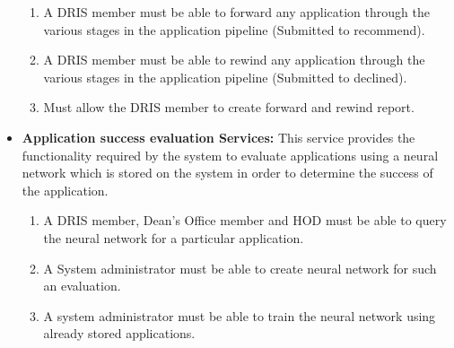 \documentclass[12pt]{article}
\begin{document}
\begin{itemize}
		\begin{enumerate}
			\item A DRIS member must be able to forward any application through the various stages in the application pipeline (Submitted to recommend). 
			\item A DRIS member must be able to rewind any application through the various stages in the application pipeline (Submitted to declined).  
			\item Must allow the DRIS member to create forward and rewind report.		
		\end{enumerate}
		\item\textbf{Application success evaluation Services:}
		This service provides the functionality required by the system to evaluate applications using a neural network which is stored on the system in order to determine the success of the application.
		\begin{enumerate}
			\item A DRIS member, Dean's Office member and HOD must be able to query the neural network for a particular application.
			\item A System administrator must be able to create neural network for such an evaluation.
			\item A system administrator must be able to train the neural network using already stored applications.					
		\end{enumerate}		
	\end{itemize}
\end{document}
